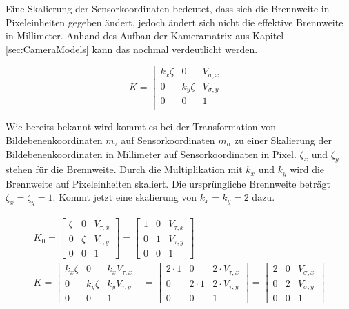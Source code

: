 Eine Skalierung der Sensorkoordinaten bedeutet, dass sich die Brennweite in Pixeleinheiten gegeben ändert, jedoch ändert sich nicht die effektive Brennweite in Millimeter. Anhand des Aufbau der Kameramatrix aus Kapitel \ref{sec:CameraModels} kann das nochmal verdeutlicht werden. 

\begin{equation}
K=  \begin{bmatrix}
k_x \zeta & 0 & V_{\sigma,x}\\
0 & k_y \zeta & V_{\sigma,y}\\
0 & 0   & 1 \\
\end{bmatrix}
\end{equation}

Wie bereits bekannt wird kommt es bei der Transformation von Bildebenenkoordinaten $m_\tau$ auf Sensorkoordinaten $m_\sigma$ zu einer Skalierung der Bildebenenkoordinaten in Millimeter auf Sensorkoordinaten in Pixel. $\zeta_x$ und $\zeta_y$ stehen für die Brennweite. Durch die Multiplikation mit $k_x$ und $k_y$ wird die Brennweite auf Pixeleinheiten skaliert. Die ursprüngliche Brennweite beträgt $\zeta_x = \zeta_y = 1$. Kommt jetzt eine skalierung von $k_x = k_y = 2$ dazu. 


\begin{gather}
	K_0=  \begin{bmatrix}
		\zeta & 0 & V_{\tau,x}\\
		0 & \zeta & V_{\tau,y}\\
		0 & 0   & 1 
	\end{bmatrix} =
	\begin{bmatrix}
	1 & 0 &  V_{\tau,x}\\
	0 & 1 &  V_{\tau,y}\\
	0 & 0 & 1 
\end{bmatrix}\\
	K= \begin{bmatrix}
		k_x \zeta & 0 & k_x V_{\tau,x}\\
		0 & k_y \zeta & k_y V_{\tau,y}\\
		0 & 0   & 1 
	\end{bmatrix} =
	\begin{bmatrix}
	2 \cdot 1 & 0 & 2 \cdot V_{\tau,x}\\
	0 & 2 \cdot 1 & 2 \cdot V_{\tau,y}\\
	0 & 0   & 1 
\end{bmatrix} = 
\begin{bmatrix}
	2 & 0 & V_{\sigma,x}\\
	0 & 2 & V_{\sigma,y}\\
	0 & 0 & 1 
\end{bmatrix}
\end{gather}

